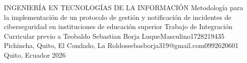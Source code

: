 \documentclass[12pt,a4paper,oneside]{report}
\begin{document}
{INGENIERÍA EN TECNOLOGÍAS DE LA INFORMACIÓN} %
{Metodología para la implementación de
un protocolo de gestión y notificación de
incidentes de ciberseguridad en
instituciones de educación superior} %
{Trabajo de Integración Curricular previo a \UTIFraseTituloPortada} %
{\UTIDatosAutores
  {Teobaldo Sebastian Borja Luque}{Masculino}{1728219435}
  {Pichincha, Quito, El Condado, La Roldos}{sebasborja319@gmail.com}{0992620601}}
{} %
{Quito, Ecuador} %
{2026} %

\UTIFrontMatter


















\UTIMainMatter








\UTIAppendixMatter


\end{document}
